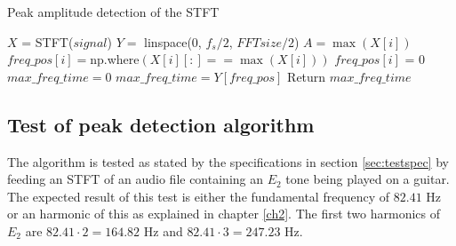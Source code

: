 \begin{algorithm}[H]
\caption{Peak amplitude detection of the STFT}
\label{alg:FIR}
\begin{algorithmic}[1]
\State  $X$ = STFT($signal$) 
\State $Y =$ linspace($0$, $f_s/2$, $FFTsize/2$) 
		\State $A = \max(X[i])$ 
		 
			\State $freq\_pos[i] = $np.where$(X[i][:] == \max(X[i]))$ 
		\Else
			\State $freq\_pos[i]$ = 0	
		\EndIf
			\State $max\_freq\_time = 0$
		\Else
			\State $max\_freq\_time = Y[freq\_pos]$
		\EndIf
	\EndFor
	\State Return $max\_freq\_time$
\EndProcedure
\end{algorithmic}
\end{algorithm}

\subsection{Test of peak detection algorithm}
The algorithm is tested as stated by the specifications in section \ref{sec:testspec} by feeding an STFT of an audio file containing an $E_2$ tone being played on a guitar.
The expected result of this test is either the fundamental frequency of $82.41$ Hz or an harmonic of this as explained in chapter \ref{ch2}. The first two harmonics of $E_2$ are $82.41 \cdot 2 = 164.82$ Hz and $82.41 \cdot 3 = 247.23$ Hz.

